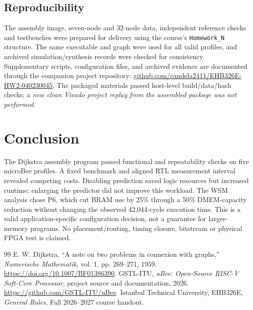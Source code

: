 \documentclass[12pt,a4paper]{article}
\begin{document}
\subsection{Reproducibility}
The assembly image, seven-node and 32-node data, independent reference checks and testbenches were prepared for delivery using the course's \texttt{Homework\_N} structure. The same executable and graph were used for all valid profiles, and archived simulation/synthesis records were checked for consistency. Supplementary scripts, configuration files, and archived evidence are documented through the companion project repository: \href{https://github.com/candela2411/EHB326E-HW2-040230045}{github.com/candela2411/EHB326E-HW2-040230045}. The packaged materials passed host-level build/data/hash checks; a \emph{new clean Vivado project replay from the assembled package was not performed}.

\section{Conclusion}
The Dijkstra assembly program passed functional and repeatability checks on five microBee profiles. A fixed benchmark and aligned RTL measurement interval revealed competing costs. Disabling prediction saved logic resources but increased runtime; enlarging the predictor did not improve this workload. The WSM analysis chose P6, which cut BRAM use by 25\% through a 50\% DMEM-capacity reduction without changing the observed 42,044-cycle execution time. This is a valid application-specific configuration decision, not a guarantee for larger-memory programs. No placement/routing, timing closure, bitstream or physical FPGA test is claimed.

\begin{thebibliography}{99}
 E. W. Dijkstra, ``A note on two problems in connexion with graphs,'' \emph{Numerische Mathematik}, vol. 1, pp. 269--271, 1959. \url{https://doi.org/10.1007/BF01386390}.
 GSTL-ITU, \emph{uBee: Open-Source RISC-V Soft-Core Processor}, project source and documentation, 2026. \url{https://github.com/GSTL-ITU/uBee}.
 Istanbul Technical University, EHB326E, \emph{General Rules}, Fall 2026--2027 course handout.
\end{thebibliography}
\end{document}
